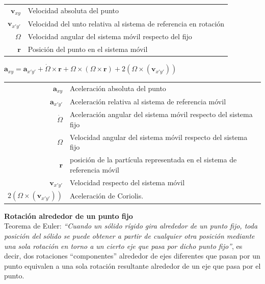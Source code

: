 \documentclass[11pt,a4paper,twocolumn]{article}
\newcommand{\vc}[1]{\textbf{#1}}
\begin{document}
	\begin{table}[!htbp]
		\centering
		\begin{tabularx}{0.5\textwidth}{rX}
			$\vc{v}_{xy}$& Velocidad absoluta del punto\\
			$\vc{v}_{x'y'}$& Velocidad del unto relativa al sistema de referencia en rotación\\
			$\Omega$ & Velocidad angular del sistema móvil respecto del fijo\\
			$\vc{r}$ &Posición del punto en el sistema móvil\\
		\end{tabularx}
	\end{table}
	
	\begin{center}
		$\vc{a}_{xy}=\vc{a}_{x'y'} + \dot{\Omega} \times \vc{r}+ \Omega \times (\Omega \times \vc{r}) + 2 (\Omega \times (\vc{v}_{x'y'}))$\\
	\end{center}
	
	\begin{table}[!htbp]
		\centering
		\begin{tabularx}{0.5\textwidth}{rX}
			$\vc{a}_{xy}$&Aceleración absoluta del punto\\
			$\vc{a}_{x'y'}$&Aceleración relativa al sistema de referencia móvil\\
			$\dot{\Omega}$&Aceleración angular del sistema móvil respecto del sistema fijo\\
			$\Omega$& Velocidad angular del sistema móvil respecto del sistema fijo\\
			$\vc{r}$& posición de la partícula representada en el sistema de referencia móvil\\
			$\vc{v}_{x'y'}$&Velocidad respecto del sistema móvil\\
			$2 (\Omega \times (\vc{v}_{x'y'}))$&Aceleración de Coriolis.\\
		\end{tabularx}%
	\end{table}%

	\textbf{Rotación alrededor de un punto fijo}\\
	Teorema de Euler: \textit{``Cuando un sólido rígido gira alrededor de un punto fijo, toda posición del sólido se puede obtener a partir de cualquier otra posición mediante una sola rotación en torno a un cierto eje que pasa por dicho punto fijo''}, es decir, dos rotaciones ``componentes'' alrededor de ejes diferentes que pasan por un punto equivalen a una sola rotación resultante alrededor de un eje que pasa por el punto.
\end{document}
